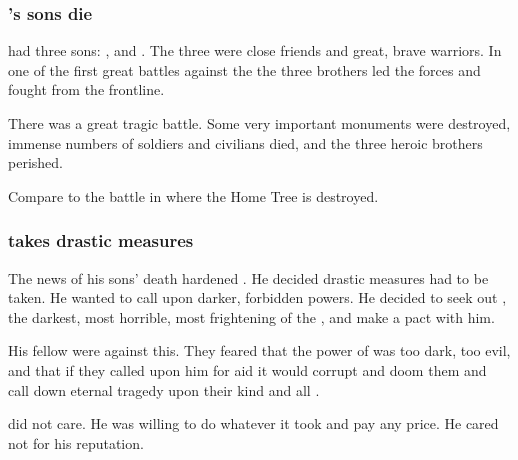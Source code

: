\subsubsection{\Ishnaruchaefir's sons die}
\Ishnaruchaefir had three sons:
,  and . 
The three were close friends and great, brave warriors. 
In one of the first great battles against the \resphain the three brothers led the \draconian forces and fought from the frontline.

There was a great tragic battle.
Some very important monuments were destroyed, immense numbers of soldiers and civilians died, and the three heroic brothers perished. 

Compare to the battle in \cite{Movie:Avatar} where the Home Tree is destroyed. 





\subsubsection{\Ishnaruchaefir takes drastic measures}
The news of his sons' death hardened \Ishnaruchaefir. 
He decided drastic measures had to be taken. 
He wanted to call upon darker, forbidden powers. 
He decided to seek out \NerrhanKoss, the darkest, most horrible, most frightening of the \xss, and make a pact with him. 

His fellow \dragons{} were against this. 
They feared that the power of \NerrhanKoss{} was too dark, too evil, and that if they called upon him for aid it would corrupt and doom them and call down eternal tragedy upon their kind and all \Miith. 

\Ishnaruchaefir did not care.
He was willing to do whatever it took and pay any price. 
He cared not for his reputation.






